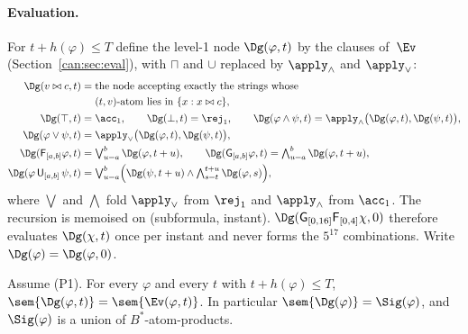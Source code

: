 \paragraph{Evaluation.}
For $t + h(\varphi) \le T$ define the level-1 node $\Dg(\varphi,t)$ by the
clauses of~$\Ev$ (Section~\ref{can:sec:eval}), with $\sqcap$ and $\cup$ replaced by
$\apply_\wedge$ and $\apply_\vee$:
\begin{align*}
  \Dg(v\bowtie c,t) &= \text{the node accepting exactly the strings whose}\\
  &\phantom{{}={}}\text{$(t,v)$-atom lies in } \{x : x\bowtie c\},\\
  \Dg(\top,t) &= \acc_1,\qquad \Dg(\bot,t)=\rej_1,\qquad
  \Dg(\varphi\wedge\psi,t) = \apply_\wedge\bigl(\Dg(\varphi,t),\Dg(\psi,t)\bigr),\\
  \Dg(\varphi\vee\psi,t) &= \apply_\vee\bigl(\Dg(\varphi,t),\Dg(\psi,t)\bigr),\\
  \Dg(\mathsf{F}_{[a,b]}\varphi,t) &= \textstyle\bigvee_{u=a}^{b}\Dg(\varphi,t+u),\qquad
  \Dg(\mathsf{G}_{[a,b]}\varphi,t) = \textstyle\bigwedge_{u=a}^{b}\Dg(\varphi,t+u),\\
  \Dg(\varphi\,\mathsf{U}_{[a,b]}\,\psi,t) &= \textstyle\bigvee_{u=a}^{b}
     \Bigl(\Dg(\psi,t+u)\wedge\bigwedge_{s=t}^{t+u}\Dg(\varphi,s)\Bigr),
\end{align*}
where $\bigvee$ and $\bigwedge$ fold $\apply_\vee$ from $\rej_1$ and
$\apply_\wedge$ from $\acc_1$. The recursion is memoised on
(subformula, instant). $\Dg(\mathsf{G}_{[0,16]}\mathsf{F}_{[0,4]}\chi,0)$ therefore
evaluates $\Dg(\chi,t)$ once per instant and never forms the $5^{17}$
combinations. Write $\Dg(\varphi) = \Dg(\varphi,0)$.

\begin{lemma}\label{lem:diag-sem}
Assume \textup{(P1)}. For every $\varphi$ and every $t$ with $t+h(\varphi)\le
T$, $\sem{\Dg(\varphi,t)} = \sem{\Ev(\varphi,t)}$. In particular
$\sem{\Dg(\varphi)} = \Sig(\varphi)$, and $\Sig(\varphi)$ is a union of
$B^*$-atom-products.
\end{lemma}

